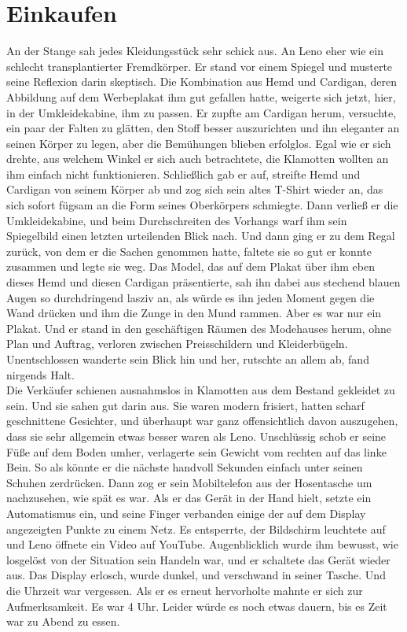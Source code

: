 \documentclass[ngerman,smalldemyvopaper,11pt,oneside,onecolumn,openright,extrafontsizes]{memoir}
\begin{document}
\chapter{Einkaufen}
An der Stange sah jedes Kleidungsstück sehr schick aus. An Leno eher wie ein schlecht transplantierter Fremdkörper. Er stand vor einem Spiegel und musterte seine Reflexion darin skeptisch. Die Kombination aus Hemd und Cardigan, deren Abbildung auf dem Werbeplakat ihm gut gefallen hatte, weigerte sich jetzt, hier, in der Umkleidekabine, ihm zu passen. Er zupfte am Cardigan herum, versuchte, ein paar der Falten zu glätten, den Stoff besser auszurichten und ihn eleganter an seinen Körper zu legen, aber die Bemühungen blieben erfolglos. Egal wie er sich drehte, aus welchem Winkel er sich auch betrachtete, die Klamotten wollten an ihm einfach nicht funktionieren. Schließlich gab er auf, streifte Hemd und Cardigan von seinem Körper ab und zog sich sein altes T-Shirt wieder an, das sich sofort fügsam an die Form seines Oberkörpers schmiegte. Dann verließ er die Umkleidekabine, und beim Durchschreiten des Vorhangs warf ihm sein Spiegelbild einen letzten urteilenden Blick nach. Und dann ging er zu dem Regal zurück, von dem er die Sachen genommen hatte, faltete sie so gut er konnte zusammen und legte sie weg. Das Model, das auf dem Plakat über ihm eben dieses Hemd und diesen Cardigan präsentierte, sah ihn dabei aus stechend blauen Augen so durchdringend lasziv an, als würde es ihn jeden Moment gegen die Wand drücken und ihm die Zunge in den Mund rammen. Aber es war nur ein Plakat. Und er stand in den geschäftigen Räumen des Modehauses herum, ohne Plan und Auftrag, verloren zwischen Preisschildern und Kleiderbügeln. Unentschlossen wanderte sein Blick hin und her, rutschte an allem ab, fand nirgends Halt.
\vspace{0.5em} \\
Die Verkäufer schienen ausnahmslos in Klamotten aus dem Bestand gekleidet zu sein. Und sie sahen gut darin aus. Sie waren modern frisiert, hatten scharf geschnittene Gesichter, und überhaupt war ganz offensichtlich davon auszugehen, dass sie sehr allgemein etwas besser waren als Leno. Unschlüssig schob er seine Füße auf dem Boden umher, verlagerte sein Gewicht vom rechten auf das linke Bein. So als könnte er die nächste handvoll Sekunden einfach unter seinen Schuhen zerdrücken. Dann zog er sein Mobiltelefon aus der Hosentasche um nachzusehen, wie spät es war. Als er das Gerät in der Hand hielt, setzte ein Automatismus ein, und seine Finger verbanden einige der auf dem Display angezeigten Punkte zu einem Netz. Es entsperrte, der Bildschirm leuchtete auf und Leno öffnete ein Video auf YouTube. Augenblicklich wurde ihm bewusst, wie losgelöst von der Situation sein Handeln war, und er schaltete das Gerät wieder aus. Das Display erlosch, wurde dunkel, und verschwand in seiner Tasche. Und die Uhrzeit war vergessen. Als er es erneut hervorholte mahnte er sich zur Aufmerksamkeit. Es war 4 Uhr. Leider würde es noch etwas dauern, bis es Zeit war zu Abend zu essen.
\end{document}
